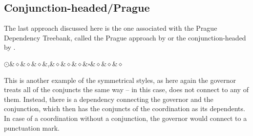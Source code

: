 \subsection{Conjunction-headed/Prague}
The last approach discussed here is the one associated with the Prague Dependency Treebank, called the Prague approach by \cite{popel2013coordination} or the conjunction-headed by \cite{prz:woz:23}.

\begin{Center}
\begin{dependency}[theme = simple]
            \begin{deptext}
    $\odot$\&$\diamond$\&$\diamond$\&$\diamond$\&,\&$\diamond$\&$\diamond$\&$\diamond$\&$\square$\&$\diamond$\&$\diamond$\&$\diamond$\\
            \end{deptext}
        \end{dependency}
\end{Center}

This is another example of the symmetrical styles, as here again the governor treats all of the conjuncts the same way -- in this case, does not connect to any of them. Instead, there is a dependency connecting the governor and the conjunction, which then has the conjuncts of the coordination as its dependents. In case of a coordination without a conjunction, the governor would connect to a punctuation mark. 

